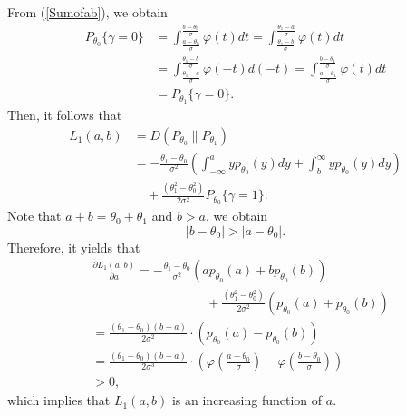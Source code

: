 \documentclass[journal]{IEEEtran}
\begin{document}
From (\ref{Sumofab}), we obtain
\begin{equation}
\begin{split}
{P_{{\theta _0}}}\{\gamma  = 0\} &= \int_{\frac{{{a} - {\theta _0}}}{\sigma }}^{\frac{{{b} - {\theta _0}}}{\sigma }} {\varphi (t)dt}  = \int_{\frac{{{\theta _1} - {b}}}{\sigma }}^{\frac{{{\theta _1} - {a}}}{\sigma }} {\varphi (t)dt} \\
&= \int_{\frac{{{\theta _1} - {a}}}{\sigma }}^{\frac{{{\theta _1} - {b}}}{\sigma }} {\varphi ( - t)d( - t)}  = \int_{\frac{{{a} - {\theta _1}}}{\sigma }}^{\frac{{{b} - {\theta _1}}}{\sigma }} {\varphi (t)dt} \\
& = {P_{{\theta _1}}}\{\gamma  = 0\}.
\end{split}
\end{equation}
Then, it follows that
\begin{equation}
\label{Lab}
\begin{split}
L_1(a,b)&=D({P_{\theta_0}}\lVert{P_{\theta_1}})\\
& =  - \frac{{{\theta _1} - {\theta _0}}}{{{\sigma ^2}}}\left( {\int_{ - \infty }^a {y{p_{{\theta _0}}}(y)dy}  + \int_b^\infty  {y{p_{{\theta _0}}}(y)dy} } \right)\\
& \quad+ \frac{{(\theta _1^2 - \theta _0^2)}}{{2{\sigma ^2}}}{P_{{\theta _0}}}\{\gamma  = 1\}.
\end{split}
\end{equation}
Note that $a+b=\theta_0+\theta_1$ and $b>a$, we obtain
\begin{equation*}
|b-\theta_{0}|>|a-\theta_{0}|.
\end{equation*}
Therefore, it yields that
\begin{equation}
\begin{split}
&\frac{{\partial L_1(a,b)}}{{\partial a}}=  - \frac{{{\theta _1} - {\theta _0}}}{{{\sigma ^2}}}\left( {a{p_{{\theta _0}}}(a) + b{p_{{\theta _0}}}(b)} \right)\\
&\quad\quad\quad\quad\quad\quad\quad\quad\quad+ \frac{{(\theta _1^2 - \theta _0^2)}}{{2{\sigma ^2}}}\left( {{p_{{\theta _0}}}(a) + {p_{{\theta _0}}}(b)} \right)\\
&= \frac{{({\theta _1} - {\theta _0})(b - a)}}{{2{\sigma ^2}}} \cdot ({p_{{\theta _0}}}(a) - {p_{{\theta _0}}}(b))\\
&= \frac{{({\theta _1} - {\theta _0})(b - a)}}{{2{\sigma ^3}}} \cdot \left( {\varphi \left( {\frac{{a - {\theta _0}}}{\sigma }} \right) - \varphi \left( {\frac{{b - {\theta _0}}}{\sigma }} \right)} \right)\\
&>0,
\end{split}
\end{equation}
which implies that $L_1(a,b)$ is an increasing function of $a$.
\end{document}
